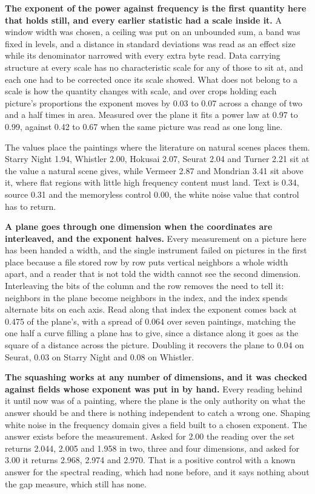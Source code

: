 \textbf{The exponent of the power against frequency is the first quantity here that holds still, and every earlier statistic had a scale inside it.} A window width was chosen, a ceiling was put on an unbounded sum, a band was fixed in levels, and a distance in standard deviations was read as an effect size while its denominator narrowed with every extra byte read. Data carrying structure at every scale has no characteristic scale for any of those to sit at, and each one had to be corrected once its scale showed. What does not belong to a scale is how the quantity changes with scale, and over crops holding each picture's proportions the exponent moves by 0.03 to 0.07 across a change of two and a half times in area. Measured over the plane it fits a power law at 0.97 to 0.99, against 0.42 to 0.67 when the same picture was read as one long line.

The values place the paintings where the literature on natural scenes places them. Starry Night 1.94, Whistler 2.00, Hokusai 2.07, Seurat 2.04 and Turner 2.21 sit at the value a natural scene gives, while Vermeer 2.87 and Mondrian 3.41 sit above it, where flat regions with little high frequency content must land. Text is 0.34, source 0.31 and the memoryless control 0.00, the white noise value that control has to return.

\textbf{A plane goes through one dimension when the coordinates are interleaved, and the exponent halves.} Every measurement on a picture here has been handed a width, and the single instrument failed on pictures in the first place because a file stored row by row puts vertical neighbors a whole width apart, and a reader that is not told the width cannot see the second dimension. Interleaving the bits of the column and the row removes the need to tell it: neighbors in the plane become neighbors in the index, and the index spends alternate bits on each axis. Read along that index the exponent comes back at 0.475 of the plane's, with a spread of 0.064 over seven paintings, matching the one half a curve filling a plane has to give, since a distance along it goes as the square of a distance across the picture. Doubling it recovers the plane to 0.04 on Seurat, 0.03 on Starry Night and 0.08 on Whistler.

\textbf{The squashing works at any number of dimensions, and it was checked against fields whose exponent was put in by hand.} Every reading behind it until now was of a painting, where the plane is the only authority on what the answer should be and there is nothing independent to catch a wrong one. Shaping white noise in the frequency domain gives a field built to a chosen exponent. The answer exists before the measurement. Asked for 2.00 the reading over the set returns 2.044, 2.005 and 1.958 in two, three and four dimensions, and asked for 3.00 it returns 2.968, 2.974 and 2.970. That is a positive control with a known answer for the spectral reading, which had none before, and it says nothing about the gap measure, which still has none.

